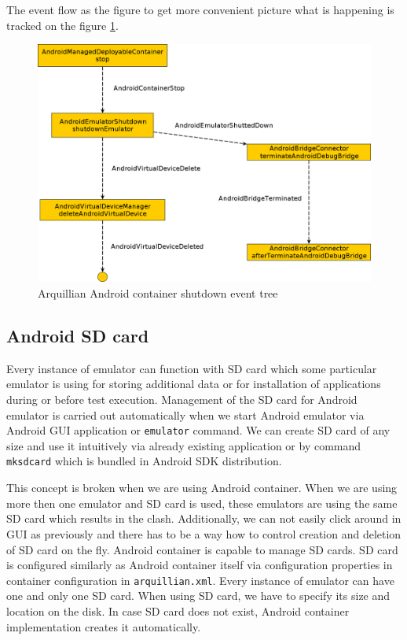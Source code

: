 \documentclass[12pt,final,oneside]{fithesis}
\begin{document}
The event flow as the figure to get more convenient picture what is happening is tracked on the figure \ref{fig:container_shutdown}. 
\newpage
\begin{figure}[!ht]
	\centering
	\includegraphics[width=120mm]{img/container-shutdown.png}
	\caption{Arquillian Android container shutdown event tree}
	\label{fig:container_shutdown}
\end{figure}

		\subsection{Android SD card}
	
Every instance of emulator can function with SD card which some particular emulator is using for storing additional data or for installation of applications during or before test execution. Management of the SD card for Android emulator is carried out automatically when we start Android emulator via Android GUI application or \texttt{emulator} command. We can create SD card of any size and use it intuitively via already existing application or by command \texttt{mksdcard} which is bundled in Android SDK distribution.

This concept is broken when we are using Android container. When we are using more then one emulator and SD card is used, these emulators are using the same SD card which results in the clash. Additionally, we can not easily click around in GUI as previously and there has to be a way how to control creation and deletion of SD card on the fly. Android container is capable to manage SD cards. SD card is configured similarly as Android container itself via configuration properties in container configuration in \texttt{arquillian.xml}. Every instance of emulator can have one and only one SD card. When using SD card, we have to specify its size and location on the disk. In case SD card does not exist, Android container implementation creates it automatically.
\end{document}

